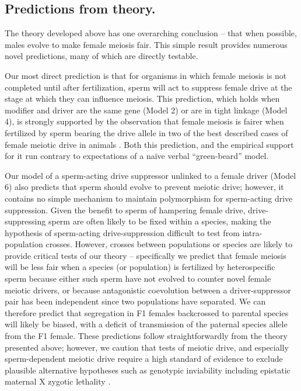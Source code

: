 \documentclass[12pt,letterpaper]{article}
\newcommand{\yb}[1]{{ \color{blue} #1}}
\begin{document}
\subsection*{Predictions from theory.} 

\yb{The theory developed above has one overarching conclusion -- that when possible, males evolve to make female meiosis fair. 
This simple result provides numerous novel predictions, many of which are directly testable. 

Our most direct prediction is that for organisms in which female  meiosis is not completed until after fertilization, 
	sperm will act to suppress female drive at the stage at which they can influence meiosis. 
This prediction, which holds when modifier and driver are the same gene (Model 2) or are in tight linkage (Model 4),  
	is strongly supported by the observation that female meiosis 
	is fairer when fertilized by sperm bearing the drive allele in 
	two of the best described cases of female meiotic drive in 
	animals \citep[the \emph{Om} and \emph{In} loci in mice, ][]{Agulnik1993,Wu2005}.  
Both this prediction, and the empirical support for it run contrary to expectations of a na\"{i}ve verbal ``green-beard'' model. 
}

\yb{Our model of a sperm-acting drive suppressor unlinked to a female driver (Model 6) also predicts that sperm should evolve to prevent meiotic drive; 
	however, it contains no simple mechanism to maintain polymorphism for sperm-acting drive suppression.
Given the benefit to sperm of hampering female drive, 
	drive-suppressing sperm are often likely to be fixed within a species, 
	making the hypothesis of sperm-acting drive-suppression difficult to test from intra-population crosses. 
However, crosses between populations or species are likely to provide critical tests of our theory -- 
	specifically we predict that female meiosis will be less fair when a species (or population) is 
	fertilized by heterospecific sperm because either such sperm have not evolved to counter novel female meiotic drivers, 
	or because antagonistic coevolution between a driver-suppressor pair has been independent since two populations have separated. 
We can therefore predict that segregation in F1 females backcrossed to parental species will likely be biased, 
	with a deficit of transmission of the paternal species allele from the F1  female.   
These predictions follow straightforwardly from the
	theory presented above; however, we caution that tests of meiotic drive, 
	and especially sperm-dependent meiotic drive require a high standard
	of evidence  to exclude plausible alternative hypotheses such as genotypic 
	inviability including epistatic maternal X zygotic lethality \citep[e.g. ][]{Sawamura:1993aa}.  \newline
}
\end{document}
